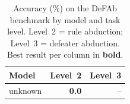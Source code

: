 \begin{table}[t]
  \centering
  \caption{Accuracy (\%) on the DeFAb benchmark by model and task level.
           Level~2 = rule abduction; Level~3 = defeater abduction.
           Best result per column in \textbf{bold}.}
  \label{tab:main_results}
  \begin{tabular}{lrr}
    \toprule
    Model & Level~2 & Level~3 \\
    \midrule
    unknown & \textbf{0.0} & -- \\
    \bottomrule
  \end{tabular}
\end{table}
